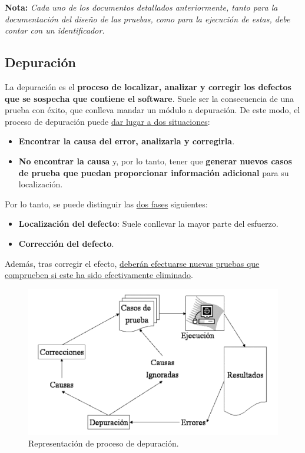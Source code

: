 \textbf{Nota:} \textit{Cada uno de los documentos detallados anteriormente, tanto para la documentación del diseño de las pruebas, como para la ejecución de estas, debe contar con un identificador.}

\subsection{Depuración}
La depuración es el \textbf{proceso de localizar, analizar y corregir los defectos que se sospecha que contiene el software}. Suele ser la consecuencia de una prueba con éxito, que conlleva mandar un módulo a depuración. De este modo, el proceso de depuración puede \uline{dar lugar a dos situaciones}:

\begin{itemize}
    \item \textbf{Encontrar la causa del error, analizarla y corregirla}.
    \item \textbf{No encontrar la causa} y, por lo tanto, tener que \textbf{generar nuevos casos de prueba que puedan proporcionar información adicional} para su localización.
\end{itemize}

Por lo tanto, se puede distinguir las \uline{dos fases} siguientes:

\begin{itemize}
    \item \textbf{Localización del defecto}: Suele conllevar la mayor parte del esfuerzo.
    \item \textbf{Corrección del defecto}.
\end{itemize}

Además, tras corregir el efecto, \uline{deberán efectuarse nuevas pruebas que comprueben si este ha sido efectivamente eliminado}.

\begin{figure}[H]
    \centering
    \includegraphics[width=0.7\linewidth]{Resources/Tema6/ProcesoDepuracion.png}
    \caption{Representación de proceso de depuración.}
\end{figure}

